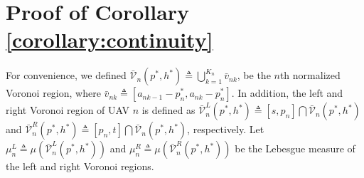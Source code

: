 \documentclass[12pt,onecolumn,final,letterpaper]{IEEEtran}
\newcommand{\Vor}{\ensuremath{\mathcal{V}}}         %
\newcommand{\junstart}{\color{black}}
\begin{document}
\junstart \section{Proof of Corollary \ref{corollary:continuity}}\label{proof:continuity} 

For convenience, we defined $\bar{\Vor}_n(p^*,
h^*)\triangleq\bigcup_{k=1}^{K_n}\bar{v}_{nk}$, be the $n$th normalized Voronoi region, where
$\bar{v}_{nk}\triangleq[a_{nk-1}-p^*_n,a_{nk}-p^*_n]$.
In addition, the left and right Voronoi region of UAV $n$ is defined as $\bar{\Vor}^{L}_{n}(p^*, h^*) \triangleq
[s,p_n]\bigcap\bar{\Vor}_{n}(p^*, h^*)$ and $\bar{\Vor}^{R}_{n}(p^*, h^*) \triangleq [p_n, t]\bigcap\bar{\Vor}_{n}(p^*,
h^*)$, respectively.  Let $\mu^L_n\triangleq\mu\left(\bar{\Vor}^{L}_{n}(p^*, h^*)\right)$ and
$\mu^R_n\triangleq\mu\left(\bar{\Vor}^{R}_{n}(p^*, h^*)\right)$ be the Lebesgue measure of the left and right Voronoi
regions.
\end{document}
